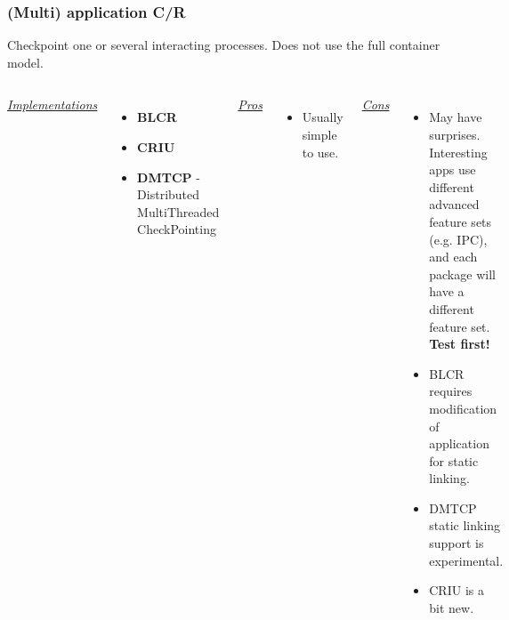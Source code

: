 \documentclass[compress]{beamer}
\begin{document}
\begin{frame}
\frametitle{(Multi) application C/R}

Checkpoint one or several interacting processes. Does not use the full container model.

\begin{columns}[t]
\ul{\textit{Implementations}}
\begin{itemize}
\item \textbf{BLCR}
\item \textbf{CRIU}
\item \textbf{DMTCP} - Distributed MultiThreaded CheckPointing
\end{itemize}

\ul{\textit{Pros}}
\begin{itemize}
\item Usually simple to use.
\end{itemize}

\ul{\textit{Cons}}
\begin{itemize}
\item May have surprises. Interesting apps use different
advanced feature sets (e.g. IPC), and each package
will have a different feature set. \textbf{Test first!}
\item BLCR requires modification of application for static linking.
\item DMTCP static linking support is experimental.
\item CRIU is a bit new.
\end{itemize}

\end{columns}






\end{frame}
  
\end{document}
